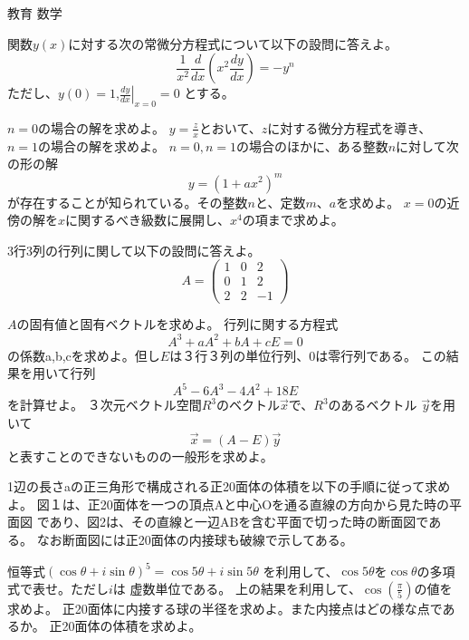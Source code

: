 \documentclass[fleqn]{jbook}
\begin{document}
\begin{question}{教育 数学}{}
\begin{subquestions}

\SubQuestion
 関数$y(x)$に対する次の常微分方程式について以下の設問に答えよ。
   \[\frac{1}{x^2}\frac{d}{dx}\left(x^2\frac{dy}{dx}\right)=-y^n\]
ただし、$y(0)=1$,$\displaystyle{
\left.\frac{dy}{dx}\right|_{x=0}=0}$ とする。
\begin{subsubquestions}
\SubSubQuestion
$n=0$の場合の解を求めよ。
\SubSubQuestion 
$y=\displaystyle{\frac{z}{x}}$とおいて、$z$に対する微分方程式を導き、
$n=1$の場合の解を求めよ。
\SubSubQuestion
$n=0,n=1$の場合のほかに、ある整数$n$に対して次の形の解
    \[y=(1+ax^2)^m\]
が存在することが知られている。その整数$n$と、定数$m$、$a$を求めよ。
\SubSubQuestion
$x=0$の近傍の解を$x$に関するべき級数に展開し、$x^4$の項まで求めよ。
\end{subsubquestions}

\SubQuestion
3行3列の行列に関して以下の設問に答えよ。
\[ A=\left(\begin{array}{rrr}
            1 & 0 & 2 \\
            0 & 1 & 2 \\
            2 & 2 & -1
          \end{array}\right)\]

\begin{subsubquestions}
\SubSubQuestion
$A$の固有値と固有ベクトルを求めよ。
\SubSubQuestion
行列に関する方程式
 \[A^3+aA^2+bA+cE=0 \]
の係数a,b,cを求めよ。但し$E$は３行３列の単位行列、$0$は零行列である。
この結果を用いて行列
   \[A^5-6A^3-4A^2+18E \]
を計算せよ。
\SubSubQuestion
 ３次元ベクトル空間$R^3$のベクトル$\vec{x}$で、$R^3$のあるベクトル
$\vec{y}$を用いて
 \[ \vec{x}=(A-E)\vec{y} \]
と表すことのできないものの一般形を求めよ。
\end{subsubquestions}

\SubQuestion
1辺の長さaの正三角形で構成される正20面体の体積を以下の手順に従って求めよ。
図１は、正20面体を一つの頂点Aと中心Oを通る直線の方向から見た時の平面図
であり、図2は、その直線と一辺ABを含む平面で切った時の断面図である。
なお断面図には正20面体の内接球も破線で示してある。
\begin{subsubquestions}
\SubSubQuestion
恒等式$(\cos\theta+{ i}\sin\theta)^5=\cos5\theta+{ i}\sin5\theta$
を利用して、$\cos5\theta$を$\cos\theta$の多項式で表せ。ただし$i$は
虚数単位である。
\SubSubQuestion
 上の結果を利用して、$\displaystyle{\cos\left(
\frac{\pi}{5}\right)}$の値を求めよ。
\SubSubQuestion
 正20面体に内接する球の半径を求めよ。また内接点はどの様な点であるか。
\SubSubQuestion
 正20面体の体積を求めよ。


\end{subsubquestions}
\end{subquestions}
\end{question}
\end{document}
